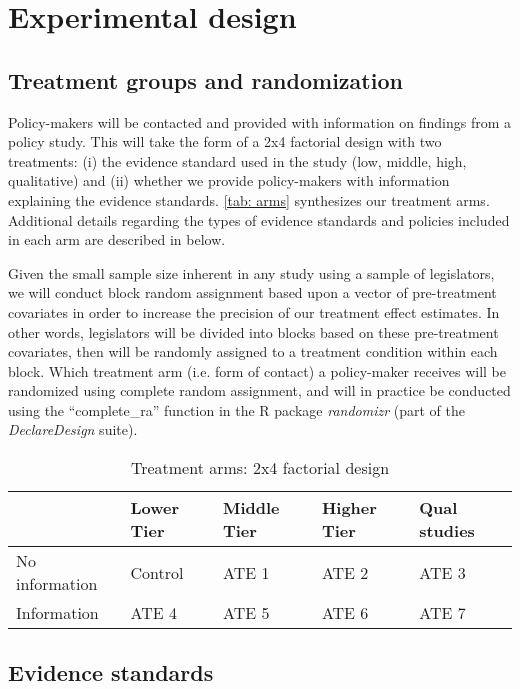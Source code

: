 \documentclass[12pt,final,fleqn]{article}
\theoremstyle{plain}
\begin{document}
\section{Experimental design} \label{sec:Design}

\subsection{Treatment groups and randomization} \label{sec:Treatment}

Policy-makers will be contacted and provided with information on findings from a policy study. This will take the form of a 2x4 factorial design with two treatments: (i) the evidence standard used in the study (low, middle, high, qualitative) and (ii) whether we provide policy-makers with information explaining the evidence standards. \autoref{tab: arms} synthesizes our treatment arms. Additional details regarding the types of evidence standards and policies included in each arm are described in  below. 

Given the small sample size inherent in any study using a sample of legislators, we will conduct block random assignment based upon a vector of pre-treatment covariates in order to increase the precision of our treatment effect estimates. In other words, legislators will be divided into blocks based on these pre-treatment covariates, then will be randomly assigned to a treatment condition within each block. Which treatment arm (i.e. form of contact) a policy-maker receives will be randomized using complete random assignment, and will in practice be conducted using the ``complete\_ra'' function in the R package \textit{randomizr} (part of the \textit{DeclareDesign} suite).

\begin{table}[H]
\centering
\caption{Treatment arms: 2x4 factorial design}
\label{tab: arms} 
\bigbreak
\begin{tabular}{|l|l|l|l|l|}
\hline
               & Lower Tier & Middle Tier & Higher Tier & Qual studies      \\ \hline
No information & Control    & ATE 1        & ATE 2        & ATE 3             \\ \hline
Information    & ATE 4       & ATE 5        & ATE 6        & ATE 7             \\ \hline
\end{tabular}
\end{table}

\subsection{Evidence standards} \label{sec:Evidence}
\end{document}
